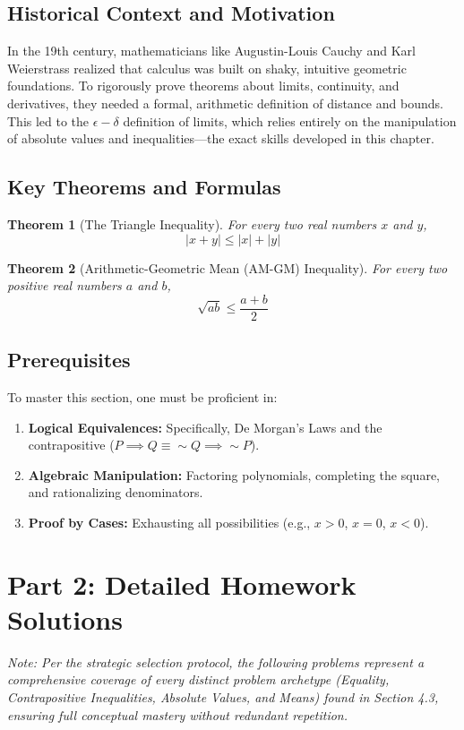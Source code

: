 \documentclass[11pt]{article}
\newtheorem{theorem}{Theorem}[section]
\newcommand{\abs}[1]{\left|#1\right|}
\begin{document}
\subsection{Historical Context and Motivation}
In the 19th century, mathematicians like Augustin-Louis Cauchy and Karl Weierstrass realized that calculus was built on shaky, intuitive geometric foundations. To rigorously prove theorems about limits, continuity, and derivatives, they needed a formal, arithmetic definition of distance and bounds. This led to the $\epsilon-\delta$ definition of limits, which relies entirely on the manipulation of absolute values and inequalities—the exact skills developed in this chapter.

\subsection{Key Theorems and Formulas}
\begin{theorem}[The Triangle Inequality]
For every two real numbers $x$ and $y$, 
\[ \abs{x + y} \le \abs{x} + \abs{y} \]
\end{theorem}

\begin{theorem}[Arithmetic-Geometric Mean (AM-GM) Inequality]
For every two positive real numbers $a$ and $b$,
\[ \sqrt{ab} \le \frac{a + b}{2} \]
\end{theorem}

\subsection{Prerequisites}
To master this section, one must be proficient in:
\begin{enumerate}
    \item \textbf{Logical Equivalences:} Specifically, De Morgan's Laws and the contrapositive ($P \implies Q \equiv \sim Q \implies \sim P$).
    \item \textbf{Algebraic Manipulation:} Factoring polynomials, completing the square, and rationalizing denominators.
    \item \textbf{Proof by Cases:} Exhausting all possibilities (e.g., $x > 0$, $x = 0$, $x < 0$).
\end{enumerate}

\newpage
\section{Part 2: Detailed Homework Solutions}
\textit{Note: Per the strategic selection protocol, the following problems represent a comprehensive coverage of every distinct problem archetype (Equality, Contrapositive Inequalities, Absolute Values, and Means) found in Section 4.3, ensuring full conceptual mastery without redundant repetition.}
\end{document}
